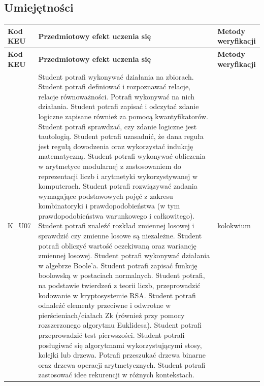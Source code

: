 \documentclass[12pt, a4paper]{article}
\newcommand{\thdrule}{\noalign{\global\setlength{\extrarowheight}{0pt}}}
\newcommand{\thdend}{\noalign{\global\setlength{\extrarowheight}{3pt}}}
\begin{document}
\subsection*{Umiejętności}
{\scriptsize
\begin{longtable}{m{1.6cm}m{9.0cm}m{4.2cm}}
\thdrule\toprule
\rowcolor{pjatkRed} {\color{white}\footnotesize\textbf{\vphantom{Ag}Kod KEU}} & {\color{white}\footnotesize\textbf{\vphantom{Ag}Przedmiotowy efekt uczenia się}} & {\color{white}\footnotesize\textbf{\vphantom{Ag}Metody weryfikacji}} \\
\midrule\thdend
\endfirsthead
\thdrule\toprule
\rowcolor{pjatkRed} {\color{white}\footnotesize\textbf{\vphantom{Ag}Kod KEU}} & {\color{white}\footnotesize\textbf{\vphantom{Ag}Przedmiotowy efekt uczenia się}} & {\color{white}\footnotesize\textbf{\vphantom{Ag}Metody weryfikacji}} \\
\midrule\thdend
\endhead
  \rowcolor{tableRowLight} K\_U07 & Student potrafi wykonywać działania na zbiorach. Student potrafi definiować i rozpoznawać relacje, relacje równoważności. Potrafi wykonywać na nich działania. Student potrafi zapisać i odczytać zdanie logiczne zapisane również za pomocą kwantyfikatorów. Student potrafi sprawdzać, czy zdanie logiczne jest tautologią. Student potrafi uzasadnić, że dana reguła jest regułą dowodzenia oraz wykorzystać indukcję matematyczną. Student potrafi wykonywać obliczenia w arytmetyce modularnej z zastosowaniem do reprezentacji liczb i arytmetyki wykorzystywanej w komputerach. Student potrafi rozwiązywać zadania wymagające podstawowych pojęć z zakresu kombinatoryki i prawdopodobieństwa (w tym prawdopodobieństwa warunkowego i całkowitego). Student potrafi znaleźć rozkład zmiennej losowej i sprawdzić czy zmienne losowe są niezależne. Student potrafi obliczyć wartość oczekiwaną oraz wariancję zmiennej losowej. Student potrafi wykonywać działania w algebrze Boole’a. Student potrafi zapisać funkcję boolowską w postaciach normalnych.  Student potrafi, na podstawie twierdzeń z teorii liczb, przeprowadzić kodowanie w kryptosystemie RSA. Student potrafi odnaleźć elementy przeciwne i odwrotne w pierścieniach/ciałach Zk (również przy pomocy rozszerzonego algorytmu Euklidesa). Student potrafi przeprowadzić test pierwszości. Student potrafi posługiwać się algorytmami wykorzystującymi stosy, kolejki lub drzewa. Potrafi przeszukać drzewa binarne oraz drzewa operacji arytmetycznych. Student potrafi zastosować idee rekurencji w różnych kontekstach. & kolokwium \\
\bottomrule
\end{longtable}}
\end{document}
